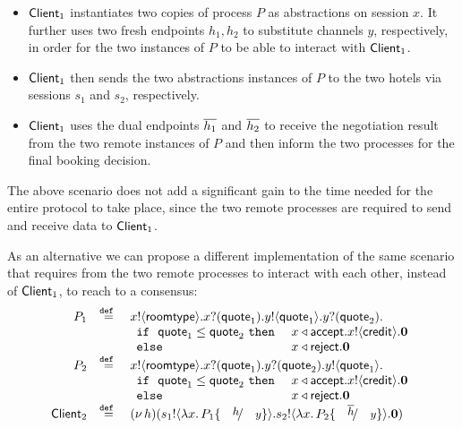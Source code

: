 \begin{example}
\begin{itemize}
	\item	$\mathsf{Client}_1$ instantiates two copies of process $P$ as abstractions
		on session $x$. It further uses two
		fresh endpoints $h_1, h_2$ to substitute channels $y$, respectively,
		in order for the two instances of $P$ to be able to interact
		with $\mathsf{Client}_1$.
	
	\item	$\mathsf{Client}_1$ then sends the two abstractions instances of $P$
		to the two hotels via sessions $s_1$ and $s_2$, respectively.

	\item	$\mathsf{Client}_1$ uses the dual endpoints $\overline{h_1}$ and $\overline{h_2}$
		to receive the negotiation
		result from the two remote instances of $P$ and then inform the two
		processes for the final booking decision.
\end{itemize}

The above scenario does not add a significant gain
to the time needed for the entire protocol to take
place, since the two remote processes are required
to send and receive data to $\mathsf{Client}_1$.

As an alternative we can propose a different implementation
of the same scenario that requires from the two
remote processes to interact with each other,
instead of $\mathsf{Client}_1$, to reach to a consensus:
%
\[
	\begin{array}{rcl}
		P_1 &\defeq&	\bout{x}{\rtype} \binp{x}{\Quote_1} \bout{y}{\Quote_1} \binp{y}{\Quote_2}\\
			&&
				\begin{array}{ll}
					\If\ \Quote_1 \leq \Quote_2\ \Then & \bsel{x}{\accept} \bout{x}{\creditc} \inact\\
					\Else & \bsel{x}{\reject} \inact
				\end{array}
		\\
		P_2 &\defeq&	\bout{x}{\rtype} \binp{x}{\Quote_1} \binp{y}{\Quote_2} \bout{y}{\Quote_1}\\
			&&
				\begin{array}{ll}
					\If\ \Quote_1 \leq \Quote_2\ \Then & \bsel{x}{\accept} \bout{x}{\creditc} \inact\\
					\Else & \bsel{x}{\reject} \inact
				\end{array}
		\\
		\Client_2 &\defeq& \newsp{h}{\bout{s_1}{\abs{x}{P_1 \subst{h}{y}}} \bout{s_2}{\abs{x}{P_2 \subst{\dual{h}}{y}}} \inact}
	\end{array}
\]
\end{example}

